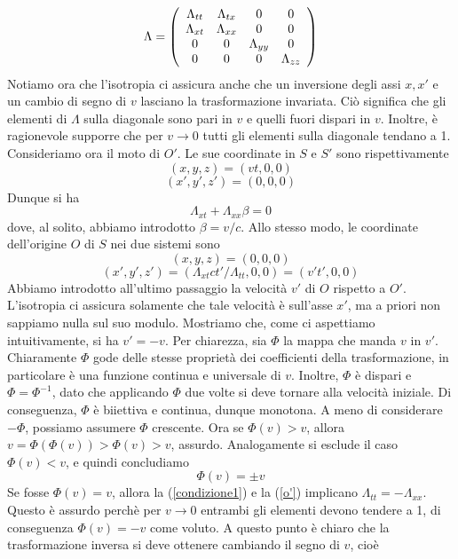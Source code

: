 \documentclass[a4paper,11pt]{book}
\theoremstyle{theorem}
\theoremstyle{definition}
\begin{document}
\[\Lambda=\left(\begin{array}{c c c c}
\Lambda_{tt}&\Lambda_{tx}&0&0\\
\Lambda_{xt}&\Lambda_{xx}&0&0\\
0&0&\Lambda_{yy}&0\\
0&0&0&\Lambda_{zz}
\end{array}\right)\]
Notiamo ora che l'isotropia ci assicura anche che un inversione degli assi $x,x'$ e un cambio di segno di $v$ lasciano la trasformazione invariata. Ciò significa che gli elementi di $\Lambda$ sulla diagonale sono pari in $v$ e quelli fuori dispari in $v$. Inoltre, è ragionevole supporre che per $v\to0$ tutti gli elementi sulla diagonale tendano a 1. Consideriamo ora il moto di $O'$. Le sue coordinate in $S$ e $S'$ sono rispettivamente
\[(x,y,z)=(vt,0,0)\]
\[(x',y',z')=(0,0,0)\]
Dunque si ha
\begin{equation}\label{condizione1}\Lambda_{xt}+\Lambda_{xx}\beta=0\end{equation}
dove, al solito, abbiamo introdotto $\beta=v/c$. Allo stesso modo, le coordinate dell'origine $O$ di $S$ nei due sistemi sono
\[(x,y,z)=(0,0,0)\]
\begin{equation}\label{o'}(x',y',z')=(\Lambda_{xt}ct'/\Lambda_{tt},0,0)=(v't',0,0)\end{equation}
Abbiamo introdotto all'ultimo passaggio la velocità $v'$ di $O$ rispetto a $O'$. L'isotropia ci assicura solamente che tale velocità è sull'asse $x'$, ma a priori non sappiamo nulla sul suo modulo. Mostriamo che, come ci aspettiamo intuitivamente, si ha $v'=-v$. Per chiarezza, sia $\Phi$ la mappa che manda $v$ in $v'$. Chiaramente $\Phi$ gode delle stesse proprietà dei coefficienti della trasformazione, in particolare è una funzione continua e universale di $v$. Inoltre, $\Phi$ è dispari e $\Phi=\Phi^{-1}$, dato che applicando $\Phi$ due volte si deve tornare alla velocità iniziale. Di conseguenza, $\Phi$ è biiettiva e continua, dunque monotona. A meno di considerare $-\Phi$, possiamo assumere $\Phi$ crescente. Ora se $\Phi(v)>v$, allora $v=\Phi(\Phi(v))>\Phi(v)>v$, assurdo. Analogamente si esclude il caso $\Phi(v)<v$, e quindi concludiamo
\[\Phi(v)=\pm v\]
Se fosse $\Phi(v)=v$, allora la (\ref{condizione1}) e la (\ref{o'}) implicano $\Lambda_{tt}=-\Lambda_{xx}$. Questo è assurdo perchè per $v\to0$ entrambi gli elementi devono tendere a 1, di conseguenza $\Phi(v)=-v$ come voluto. A questo punto è chiaro che la trasformazione inversa si deve ottenere cambiando il segno di $v$, cioè
\end{document}
